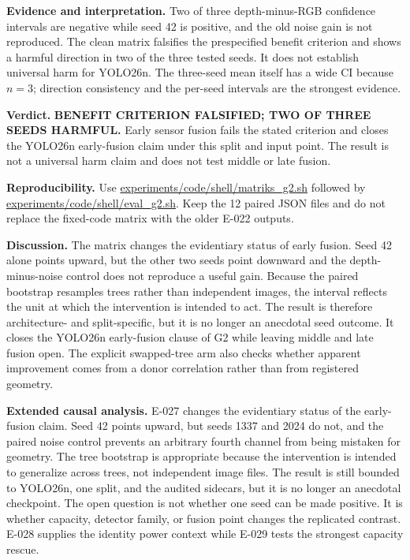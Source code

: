 \documentclass[preprint,12pt]{elsarticle}
\newcommand{\pathcode}[1]{\scriptsize\url{#1}}
\begin{document}
\textbf{Evidence and interpretation.} Two of three depth-minus-RGB
confidence intervals are negative while seed 42 is positive, and the old
noise gain is not reproduced. The clean matrix falsifies the prespecified
benefit criterion and shows a harmful direction in two of the three tested
seeds. It does not establish universal harm for YOLO26n. The three-seed mean
itself has a wide CI because \(n=3\); direction consistency and the per-seed
intervals are the strongest evidence.

\textbf{Verdict.} \textbf{BENEFIT CRITERION FALSIFIED; TWO OF THREE SEEDS
HARMFUL.} Early sensor fusion fails the stated criterion and closes
the YOLO26n early-fusion claim under this split and input point. The result is
not a universal harm claim and does not test middle or late fusion.

\textbf{Reproducibility.} Use \pathcode{experiments/code/shell/matriks_g2.sh}
followed by \pathcode{experiments/code/shell/eval_g2.sh}. Keep the 12
paired JSON files and do not replace
the fixed-code matrix with the older E-022 outputs.

\textbf{Discussion.} The matrix changes the evidentiary status of early
fusion. Seed 42 alone points upward, but the other two seeds point downward
and the depth-minus-noise control does not reproduce a useful gain. Because
the paired bootstrap resamples trees rather than independent images, the
interval reflects the unit at which the intervention is intended to act. The
result is therefore architecture- and split-specific, but it is no longer an
anecdotal seed outcome. It closes the YOLO26n early-fusion clause of G2 while
leaving middle and late fusion open. The explicit swapped-tree arm also
checks whether apparent improvement comes from a donor correlation rather
than from registered geometry.

\textbf{Extended causal analysis.} E-027 changes the evidentiary status of
the early-fusion claim. Seed 42 points upward, but seeds 1337 and 2024 do not,
and the paired noise control prevents an arbitrary fourth channel from being
mistaken for geometry. The tree bootstrap is appropriate because the
intervention is intended to generalize across trees, not independent image
files. The result is still bounded to YOLO26n, one split, and the audited
sidecars, but it is no longer an anecdotal checkpoint. The open question is
not whether one seed can be made positive. It is whether capacity, detector
family, or fusion point changes the replicated contrast. E-028 supplies the
identity power context while E-029 tests the strongest capacity rescue.
\end{document}
